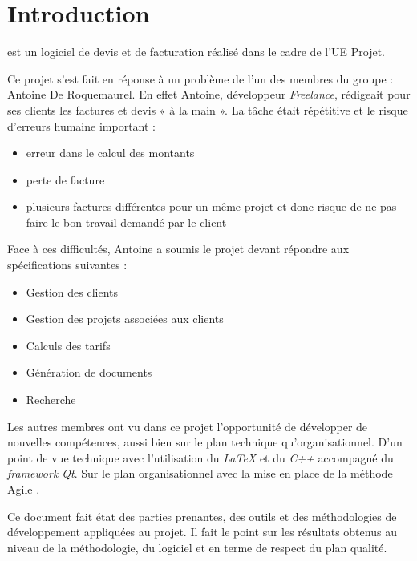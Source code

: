 \chapter*{Introduction}

\setlength{\parindent}{1cm}
\FactDev  est un logiciel de devis et de facturation réalisé dans le cadre de l’UE Projet. 

Ce projet s’est fait en réponse à un problème de l’un des membres du groupe : Antoine De Roquemaurel. En effet Antoine, développeur \textit{Freelance}, rédigeait pour ses clients les factures et devis « à la main ». La tâche était répétitive et le risque d’erreurs humaine important : 
\begin{itemize}
	\item erreur dans le calcul des montants
	\item perte de facture
	\item plusieurs factures différentes pour un même projet et donc risque de ne pas faire le bon travail demandé par le client
\end{itemize}

Face à ces difficultés, Antoine a soumis le projet devant répondre aux spécifications suivantes :
\begin{itemize}
	\item Gestion des clients
	\item Gestion des projets associées aux clients
	\item Calculs des tarifs
	\item Génération de documents
	\item Recherche
\end{itemize}


Les autres membres ont vu dans ce projet l'opportunité de développer de nouvelles compétences, aussi bien sur le plan technique qu'organisationnel. D'un point de vue technique avec l'utilisation du \textit{LaTeX} et du \textit{C++} accompagné du \textit{framework Qt}. Sur le plan organisationnel avec la mise en place de la méthode Agile \Scrum. 

Ce document fait état des parties prenantes, des outils et des méthodologies de développement appliquées au projet. Il fait le point sur les résultats obtenus au niveau de la méthodologie, du logiciel et en terme de respect du plan qualité. 